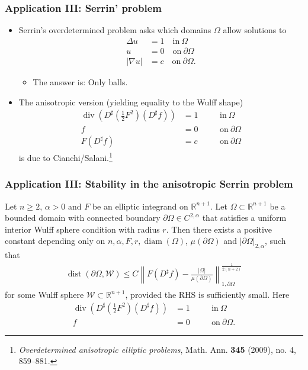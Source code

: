 \documentclass{beamer}
\newcommand{\sub}{\subset}
\newcommand{\bbR}{\mathbb{R}}
\newcommand{\8}{\infty}
\newcommand{\al}{\alpha}
\newcommand{\Om}{\Omega}
\newcommand{\De}{\Delta}
\newcommand{\cW}{\mathcal{W}}
\newcommand{\del}{\partial}
\newcommand{\n}{\nabla}
\newcommand{\tfr}[2]{\tfrac{#1}{#2}}
\DeclareMathOperator{\dive}{div}
\DeclareMathOperator{\dist}{dist}
\DeclareMathOperator{\diam}{diam}
\newcommand{\eq}[1]{\begin{equation}\begin{alignedat}{2} #1 \end{alignedat}\end{equation}}
\newcommand{\abs}[1]{\lvert #1\rvert}
\newcommand{\q}{\quad}
\begin{document}
\begin{frame} 
\frametitle{Application III: Serrin' problem}
\begin{itemize}
\item Serrin's overdetermined problem asks which domains $\Om$ allow solutions to
\eq{\De u & = 1\q \mbox{in}~\Om\\
	u&= 0\q\mbox{on}~\del\Om\\
	\abs{\n u}&=c\q\mbox{on}~\del\Om.}
\begin{itemize}
	\item The answer is: Only balls.
\end{itemize}

\item The anisotropic version (yielding equality to the Wulff shape)
 \eq{\dive(D^{\sharp}(\tfr 12 F^{2})(D^{\sharp }f)) &=1\q &&\mbox{in}~\Om\\
	f&=0\q &&\mbox{on}~\del\Om\\
	F(D^{\sharp}f) &= c\q&&\mbox{on}~\del\Om}
is due to Cianchi/Salani.\footnote{{\it Overdetermined anisotropic elliptic problems}, Math. Ann. {\bf 345} (2009), no. 4, 859--881.}

\end{itemize}


\end{frame}


\begin{frame} 
\frametitle{Application III: Stability in the anisotropic Serrin problem}

\begin{theorem}
Let $n\geq 2$, $\al>0$ and $F$ be an elliptic integrand on $\mathbb{R}^{n+1}$.
Let $\Om\sub \bbR^{n+1}$ be a bounded domain with connected boundary $\del\Om\in C^{2,\al}$ that satisfies a uniform interior Wulff sphere condition with radius $r$. 
Then there exists a positive constant depending only on $n,\al, F,r,\diam(\Om)$, $\mu(\del\Om)$ and $\abs{\del\Om}_{2,\al}$, such that
\eq{
\dist(\del\Om,{\cW})
    \leq C
    \left\|F(D^\sharp f)-\tfrac{\vert\Om\vert}{\mu(\del\Om)}\right\|_{1,\del\Om}^{\frac{1}{2(n+2)}}
}
for some Wulff sphere ${\cW}\subset\mathbb{R}^{n+1}$, provided the RHS is sufficiently small. Here 
 \eq{\dive(D^{\sharp}(\tfr 12 F^{2})(D^{\sharp }f)) &=1\q &&\mbox{in}~\Om\\
	f&=0\q &&\mbox{on}~\del\Om.}\end{theorem}
\end{frame}
\end{document}
